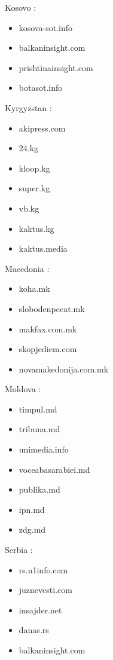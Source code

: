 \documentclass[
  letterpaper,
  DIV=11,
  numbers=noendperiod]{scrartcl}
\providecommand{\tightlist}{%
  \setlength{\itemsep}{0pt}\setlength{\parskip}{0pt}}\usepackage{longtable,booktabs,array}
\begin{document}
Kosovo :

\begin{itemize}
\tightlist
\item
  kosova-sot.info
\item
  balkaninsight.com
\item
  prishtinainsight.com
\item
  botasot.info
\end{itemize}

Kyrgyzstan :

\begin{itemize}
\tightlist
\item
  akipress.com
\item
  24.kg
\item
  kloop.kg
\item
  super.kg
\item
  vb.kg
\item
  kaktus.kg
\item
  kaktus.media
\end{itemize}

Macedonia :

\begin{itemize}
\tightlist
\item
  koha.mk
\item
  slobodenpecat.mk
\item
  makfax.com.mk
\item
  skopjediem.com
\item
  novamakedonija.com.mk
\end{itemize}

Moldova :

\begin{itemize}
\tightlist
\item
  timpul.md
\item
  tribuna.md
\item
  unimedia.info
\item
  voceabasarabiei.md
\item
  publika.md
\item
  ipn.md
\item
  zdg.md
\end{itemize}

Serbia :

\begin{itemize}
\tightlist
\item
  rs.n1info.com
\item
  juznevesti.com
\item
  insajder.net
\item
  danas.rs
\item
  balkaninsight.com
\end{itemize}
\end{document}
